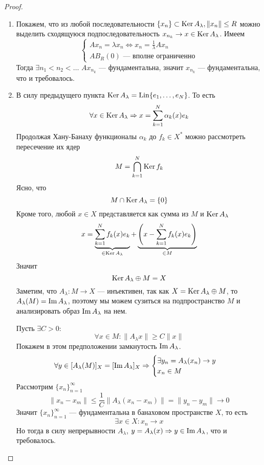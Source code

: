 \begin{proof}
	\hfill
	\begin{enumerate}
		\item Покажем, что из любой последовательности $\{x_n\} \subset \operatorname{Ker} A_\lambda, \|x_n\| \leq R$ можно выделить сходящуюся подпоследовательность $x_{n_k}\to x \in \operatorname{Ker} A_\lambda$. Имеем
		$$
		\begin{cases}
			Ax_n = \lambda x_n  \Leftrightarrow x_n = \frac{1}{\lambda}Ax_n\\
			AB_R(0) \text{ --- вполне ограниченно}
		\end{cases} 
		$$
		Тогда $ \exists n_1< n_2 < \dots$ $Ax_{n_k}$ --- фундаментальна, значит $x_{n_k}$ --- фундаментальна, что и требовалось.
		\item В силу предыдущего пункта $\operatorname{Ker} A_\lambda = \operatorname{Lin} \{e_1, \dots ,e_N\}$. То есть
		$$
		\forall x \in \operatorname{Ker} A_\lambda \Rightarrow x = \sum_{k=1}^N \alpha_k(x)e_k
		$$
		Продолжая Хану-Банаху функционалы $\alpha_k$ до $f_k \in X^*$ можно рассмотреть пересечение их ядер
		$$
		M = \bigcap_{k=1}^N\operatorname{Ker} f_k
		$$
		Ясно, что
		$$
		M \cap \operatorname{Ker} A_\lambda = \{0\}
		$$
		Кроме того, любой $x \in X$ представляется как сумма из $M$ и $\operatorname{Ker} A_\lambda$
		$$
		x = \underbrace{\sum_{k=1}^N f_k(x) e_k}_{\in \operatorname{Ker} A_\lambda} + \underbrace{\left(x - \sum_{k=1}^N f_k(x) e_k\right)}_{\in M}
		$$
		Значит
		$$
		\operatorname{Ker} A_\lambda \oplus M = X
		$$
		Заметим, что $A_\lambda \colon M \to X$ --- инъективен, так как $X = \operatorname{Ker} A_\lambda \oplus M$, то $A_\lambda(M) = \operatorname{Im} A_\lambda$, поэтому мы можем сузиться на подпространство $M$ и анализировать образ $\operatorname{Im} A_\lambda$ на нем. 
		
		
		Пусть $\exists C > 0$:
		$$
		\forall x \in M\colon \|A_\lambda x\| \geq C\|x\| 
		$$
		Покажем в этом предположении замкнутость $\operatorname{Im} A_\lambda$.
		$$
		\forall y \in [A_\lambda(M)]_X = [\operatorname{Im} A_\lambda]_X \Rightarrow \begin{cases}
			\exists y_n = A_\lambda(x_n) \to y \\
			x_n \in M
		\end{cases}
		$$
		Рассмотрим $\{x_n\}_{n=1}^\infty$
		$$
		\|x_n - x_m\| \leq \frac{1}{C}\|A_\lambda(x_n - x_m)\| = \|y_n - y_m\| \to 0 
		$$
		Значит $\{x_n\}_{n=1}^\infty$ --- фундаментальна в банаховом пространстве $X$, то есть
		$$
		\exists x \in X \colon x_n \to x 
		$$
		Но тогда в силу непрерывности $A_\lambda$, $y = A_\lambda(x) \Rightarrow y \in \operatorname{Im} A_\lambda$, что и требовалось. 
		

\end{enumerate}
\end{proof}
